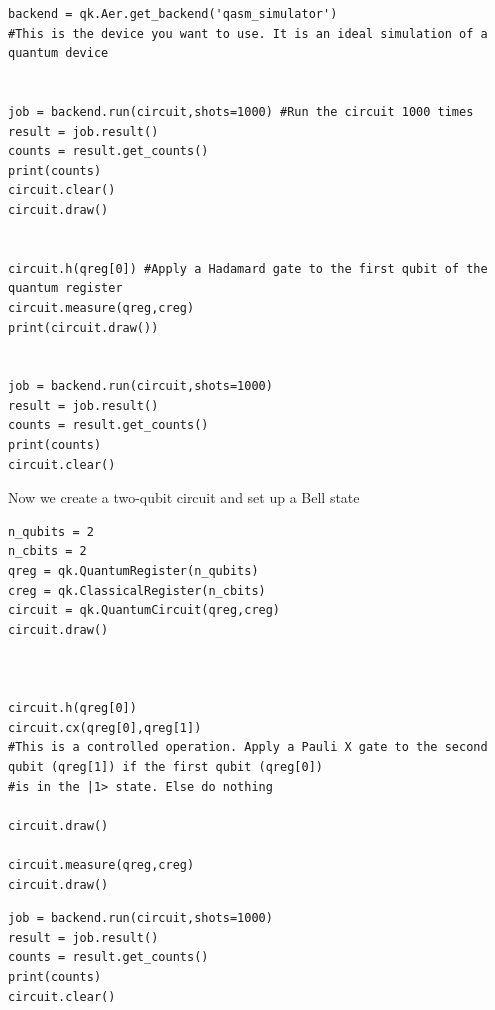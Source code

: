 \documentclass{beamer}
\begin{document}
\begin{frame}
\begin{verbatim}
backend = qk.Aer.get_backend('qasm_simulator') 
#This is the device you want to use. It is an ideal simulation of a quantum device


job = backend.run(circuit,shots=1000) #Run the circuit 1000 times
result = job.result()
counts = result.get_counts()
print(counts)
circuit.clear()
circuit.draw()


circuit.h(qreg[0]) #Apply a Hadamard gate to the first qubit of the quantum register
circuit.measure(qreg,creg)
print(circuit.draw())


job = backend.run(circuit,shots=1000)
result = job.result()
counts = result.get_counts()
print(counts)
circuit.clear()

\end{verbatim}


Now we create a two-qubit circuit and set up a Bell state




















\begin{verbatim}
n_qubits = 2
n_cbits = 2
qreg = qk.QuantumRegister(n_qubits)
creg = qk.ClassicalRegister(n_cbits)
circuit = qk.QuantumCircuit(qreg,creg)
circuit.draw()



circuit.h(qreg[0])
circuit.cx(qreg[0],qreg[1]) 
#This is a controlled operation. Apply a Pauli X gate to the second qubit (qreg[1]) if the first qubit (qreg[0])
#is in the |1> state. Else do nothing

circuit.draw()

circuit.measure(qreg,creg)
circuit.draw()

\end{verbatim}








\begin{verbatim}
job = backend.run(circuit,shots=1000)
result = job.result()
counts = result.get_counts()
print(counts)
circuit.clear()


\end{verbatim}
\end{frame}
\end{document}
